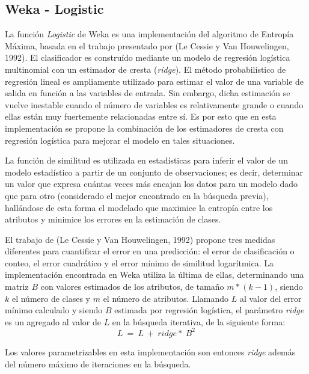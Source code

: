 \subsection{Weka - Logistic}

La funci\'on \textit{Logistic} de Weka es una implementaci\'on del algoritmo de Entrop\'ia M\'axima, basada en el trabajo presentado por (Le Cessie y Van Houwelingen, 1992). El clasificador es constru\'ido mediante un modelo de regresi\'on log\'istica multinomial con un estimador de cresta (\textit{ridge}). El m\'etodo probabil\'istico de regresi\'on lineal es ampliamente utilizado para estimar el valor de una variable de salida en funci\'on a las variables de entrada. Sin embargo, dicha estimaci\'on se vuelve inestable cuando el n\'umero de variables es relativamente grande o cuando ellas est\'an muy fuertemente relacionadas entre s\'i. Es por esto que en esta implementaci\'on se propone la combinaci\'on de los estimadores de cresta con regresi\'on log\'istica para mejorar el modelo en tales situaciones.
\newline

La funci\'on de similitud es utilizada en estad\'isticas para inferir el valor de un modelo estad\'istico a partir de un conjunto de observaciones; es decir, determinar un valor que expresa cu\'antas veces m\'as encajan los datos para un modelo dado que para otro (considerado el mejor encontrado en la b\'usqueda previa), hall\'andose de esta forma el modelado que maximice la entrop\'ia entre los atributos y minimice los errores en la estimaci\'on de clases. 
\newline 

El trabajo de (Le Cessie y Van Houwelingen, 1992) propone tres medidas diferentes para cuantificar el error en una predicci\'on: el error de clasificaci\'on o conteo, el error cuadr\'atico y el error m\'inimo de similitud logar\'itmica. La implementaci\'on encontrada en Weka utiliza la \'ultima de ellas, determinando una matriz $B$ con valores estimados de los atributos, de tama\~no $m*(k-1)$, siendo $k$ el n\'umero de clases y $m$ el n\'umero de atributos. Llamando $L$ al valor del error m\'inimo calculado y siendo $B$ estimada por regresi\'on log\'istica, el par\'ametro \textit{ridge} es un agregado al valor de $L$ en la b\'usqueda iterativa, de la siguiente forma:
$$ L \ = \ L \ + \ ridge * \ B^{2} $$

Los valores parametrizables en esta implementaci\'on son entonces \textit{ridge} adem\'as del n\'umero m\'aximo de iteraciones en la b\'usqueda.

